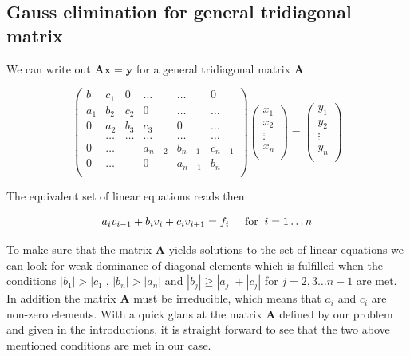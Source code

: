 \documentclass[12pt]{article}
\numberwithin{figure}{section}
\numberwithin{table}{section}
\begin{document}
\subsection{Gauss elimination for general tridiagonal matrix} \label{sec:genalgsection}
We can write out $\mathbf{A}\mathbf{x} = \mathbf{y}$ for a general tridiagonal matrix $\mathbf{A}$

\[
    \begin{pmatrix}
                           b_1& c_1& 0 &\dots   & \dots &0 \\
                           a_1 & b_2 & c_2 &0 &\dots &\dots \\
                           0& a_2 & b_3 & c_3 & 0 & \dots \\
                           & \dots   & \dots &\dots   &\dots & \dots \\
                           0&\dots   &  & a_{n-2} & b_{n-1}& c_{n-1} \\
                           0&\dots    &  & 0  & a_{n-1} & b_n \\
    \end{pmatrix}
    \begin{pmatrix}
    x_1 \\ 
    x_2 \\
    \vdots \\
    x_n \\
    \end{pmatrix}
    =
    \begin{pmatrix}
    y_1 \\
    y_2 \\
    \vdots \\
    y_n\\
    \end{pmatrix}
\] 

\noindent The equivalent set of linear equations reads then:

\begin{equation}
a_i v_{i-1} + b_i v_i + c_i v_{i+1} = f_i \hspace{0.5cm} \mbox{for} \hspace{0.2cm} i = 1 \dots n \label{linearalg}
\end{equation}

\noindent To make sure that the matrix $\mathbf{A}$ yields solutions to the set of linear equations we can look for weak dominance of diagonal elements which is fulfilled when the conditions $|b_1| > |c_1|$, $|b_n| > |a_n|$ and $|b_j|\geqslant |a_j| + |c_j|$ for $j=2, 3 \dots n-1$ are met. In addition the matrix $\mathbf{A}$ must be irreducible, which means that $a_i$ and $c_i$ are non-zero elements. \cite{Comp} With a quick glans at the matrix $\mathbf{A}$ defined by our problem and given in the introductions, it is straight forward to see that the two above mentioned conditions are met in our case.
\vspace{0.35cm}
\end{document}
